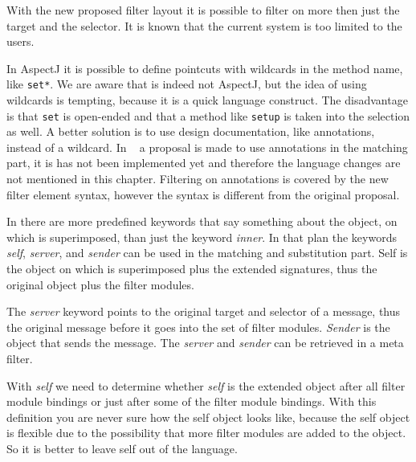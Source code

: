 With the new proposed filter layout \cite{Doornenbal2006} it is possible to filter on more then just the target and the selector. 
It is known that the current system is too limited to the users.

In AspectJ it is possible to define pointcuts with wildcards in the method name, like \lstinline!set*!. 
We are aware that \Compose* is indeed not AspectJ, but the idea of using wildcards is tempting, because it is a quick language construct. 
The disadvantage is that \lstinline!set! is open-ended and that a method like \lstinline!setup! is taken into the selection as well. 
A better solution is to use design documentation, like annotations, instead of a wildcard.
In ~\cite{Nagy2006} a proposal is made to use annotations in the matching part, it is has not been implemented yet and therefore the language changes are not mentioned in this chapter. 
Filtering on annotations is covered by the new filter element syntax, however the syntax is different from the original proposal.


In \cite{bergmans:phd94} there are more predefined keywords that say something about the object, on which is superimposed, than just the keyword \emph{inner}. 
In that plan the keywords \emph{self}, \emph{server}, and \emph{sender} can be used in the matching and substitution part. 
Self is the object on which is superimposed plus the extended signatures, thus the original object plus the filter modules.

The \emph{server} keyword points to the original target and selector of a message, thus the original message before it goes into the set of filter modules. 
\emph{Sender} is the object that sends the message. 
The \emph{server} and \emph{sender} can be retrieved in a meta filter.

With \emph{self} we need to determine whether \emph{self} is the extended object after all filter module bindings or just after some of the filter module bindings. 
With this definition you are never sure how the self object looks like, because the self object is flexible due to the possibility that more filter modules are added to the object. 
So it is better to leave self out of the language.

